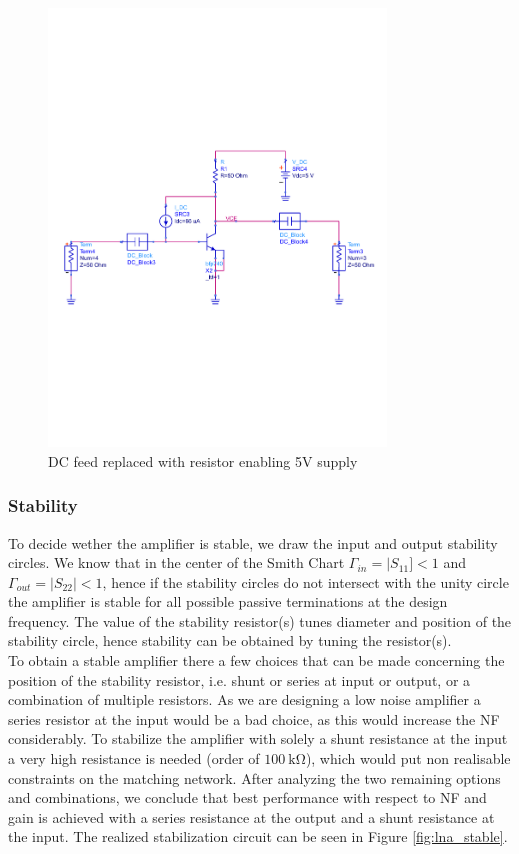 \documentclass[a4paper]{article}        %
\begin{document}
			\begin{figure}[H]
			\centering
				\includegraphics[width=0.8\textwidth]{fig/LNA/LNA_5V.pdf}
			\caption{DC feed replaced with resistor enabling 5V supply}
			\label{fig:lna_5V}
			\end{figure}

		\subsubsection{Stability}
			To decide wether the amplifier is stable, we draw the input and output stability circles. We know that in the center of the Smith Chart $\Gamma_{in} = |S_{11}] < 1$ and $\Gamma_{out} = |S_{22}| < 1$, hence if the stability circles do not intersect with the unity circle the amplifier is stable for all possible passive terminations at the design frequency.\cite{pozar} The value of the stability resistor(s) tunes diameter and position of the stability circle, hence stability can be obtained by tuning the resistor(s).\\

			 To obtain a stable amplifier there a few choices that can be made concerning the position of the stability resistor, i.e. shunt or series at input or output, or a combination of multiple resistors. As we are designing a low noise amplifier a series resistor at the input would be a bad choice, as this would increase the NF considerably. To stabilize the amplifier with solely a shunt resistance at the input a very high resistance is needed (order of $\SI{100}{\kilo\ohm}$), which would put non realisable constraints on the matching network. After analyzing the two remaining options and combinations, we conclude that best performance with respect to NF and gain is achieved with a series resistance at the output and a shunt resistance at the input. The realized stabilization circuit can be seen in Figure \ref{fig:lna_stable}.
\end{document}
